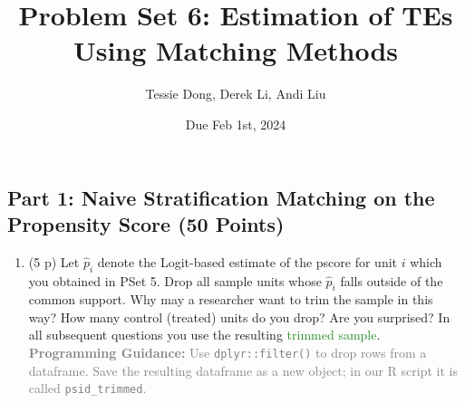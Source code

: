 \documentclass[
]{article}
\title{Problem Set 6: Estimation of TEs Using Matching Methods}
\author{Tessie Dong, Derek Li, Andi Liu}
\date{Due Feb 1st, 2024}
\providecommand{\tightlist}{%
  \setlength{\itemsep}{0pt}\setlength{\parskip}{0pt}}
\begin{document}
\maketitle



\newpage

\hypertarget{part-1-naive-stratification-matching-on-the-propensity-score-50-points}{%
\subsection{Part 1: Naive Stratification Matching on the Propensity
Score (50
Points)}\label{part-1-naive-stratification-matching-on-the-propensity-score-50-points}}



\begin{enumerate}
\def\labelenumi{\arabic{enumi}.}
\tightlist
\item
  (5 p) Let \(\widehat{p}_i\) denote the Logit-based estimate of the
  pscore for unit \(i\) which you obtained in PSet 5. Drop all sample
  units whose \(\widehat{p}_{i}\) falls outside of the common support.
  Why may a researcher want to trim the sample in this way? How many
  control (treated) units do you drop? Are you surprised? In all
  subsequent questions you use the resulting
  \textcolor{ForestGreen}{trimmed sample}.
  \textcolor{gray}{\textbf{Programming Guidance:} Use \texttt{dplyr::filter()} to drop rows from a dataframe. Save the resulting dataframe as a new object; in our R script it is called \texttt{psid\_trimmed}.}\label{item:pscore-trim}
\end{enumerate}
\end{document}
